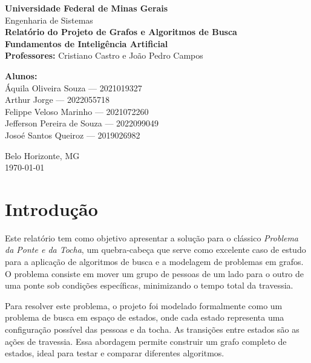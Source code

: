 \documentclass[12pt,a4paper]{article}
\begin{document}
\begin{titlepage}
    \centering
    {\Large \textbf{Universidade Federal de Minas Gerais}}\\[0.3cm]
    {\large Engenharia de Sistemas}\\[2cm]
    
    {\Huge \textbf{Relatório do Projeto de Grafos e Algoritmos de Busca}}\\[1.5cm]
    
    \textbf{Fundamentos de Inteligência Artificial}\\[0.5cm]
    \textbf{Professores:} Cristiano Castro e João Pedro Campos\\[1.5cm]
    
    \begin{flushleft}
        \textbf{Alunos:}\\
        Áquila Oliveira Souza --- 2021019327\\
        Arthur Jorge --- 2022055718\\
        Felippe Veloso Marinho --- 2021072260\\
        Jefferson Pereira de Souza --- 2022099049\\
        Josoé Santos Queiroz --- 2019026982
    \end{flushleft}
    
    \vfill
    {\large Belo Horizonte, MG}\\
    {\large \today}
\end{titlepage}

\clearpage
\tableofcontents
\clearpage

\section{Introdução}
Este relatório tem como objetivo apresentar a solução para o clássico \textit{Problema da Ponte e da Tocha}, um quebra-cabeça que serve como excelente caso de estudo para a aplicação de algoritmos de busca e a modelagem de problemas em grafos. O problema consiste em mover um grupo de pessoas de um lado para o outro de uma ponte sob condições específicas, minimizando o tempo total da travessia.

Para resolver este problema, o projeto foi modelado formalmente como um problema de busca em espaço de estados, onde cada estado representa uma configuração possível das pessoas e da tocha. As transições entre estados são as ações de travessia. Essa abordagem permite construir um grafo completo de estados, ideal para testar e comparar diferentes algoritmos.
\end{document}
